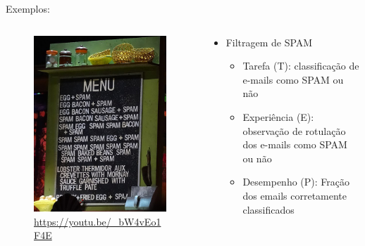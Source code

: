 \documentclass[aspectratio=169,presentation,mathserif,10pt]{beamer}
\begin{document}
\begin{frame}[label={sec:org1e3885d}]{Exemplos:}
\begin{columns}
\begin{column}{0.5\columnwidth}
\begin{figure}[htbp]
\centering
\includegraphics[height=.7\textheight]{./fig/spam.jpg}
\caption{\url{https://youtu.be/_bW4vEo1F4E}}
\end{figure}
\end{column}



\begin{column}{0.5\columnwidth}
\begin{itemize}
\item Filtragem de SPAM 

\begin{itemize}
\item Tarefa (T): classificação de e-mails como SPAM ou não
\item Experiência (E): observação de rotulação dos e-mails como SPAM ou não
\item Desempenho (P): Fração dos emails corretamente classificados
\end{itemize}
\end{itemize}
\end{column}
\end{columns}
\end{frame}
\end{document}
